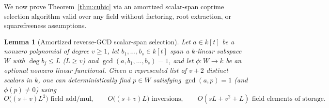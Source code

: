 \documentclass[11pt,reqno]{amsart}
\numberwithin{equation}{section}
\newtheorem{lemma}[theorem]{Lemma}
\theoremstyle{definition}
\theoremstyle{remark}
\begin{document}
We now prove Theorem~\ref{thm:cubic} via an amortized scalar-span coprime selection algorithm valid over any field without factoring, root extraction, or squarefreeness assumptions.

\begin{lemma}[Amortized reverse-GCD scalar-span selection]
\label{lem:reverse-gcd}
Let $a\in k[t]$ be a nonzero polynomial of degree $v\ge 1$, let $b_1,\ldots,b_s\in k[t]$ span a $k$-linear subspace $W$ with $\deg b_j\le L$ ($L\ge v$) and $\gcd(a,b_1,\ldots,b_s)=1$, and let $\phi:W\to k$ be an optional nonzero linear functional. Given a represented list of $v+2$ distinct scalars in $k$, one can deterministically find $p\in W$ satisfying $\gcd(a,p)=1$ (and $\phi(p)\ne 0$) using
\[
O\bigl((s+v)L^2\bigr) \text{ field add/mul},\qquad O\bigl((s+v)L\bigr) \text{ inversions},\qquad O(sL + v^2 + L) \text{ field elements of storage}.
\]
\end{lemma}
\end{document}
